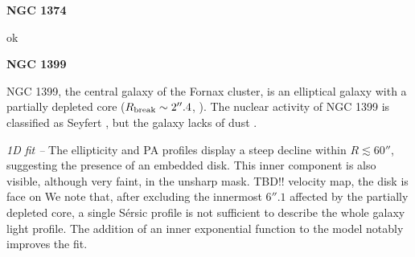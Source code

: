 \documentclass[preprint2]{emulateapj}
\begin{document}
  \clearpage\newpage\noindent
  {\bf NGC 1374 \\}

  ok

  \clearpage\newpage\noindent
  {\bf NGC 1399 \\}

  NGC 1399, the central galaxy of the Fornax cluster, is an elliptical galaxy with a partially depleted core 
  ($R_{\rm break} \sim 2''.4$, \citealt{rusli2013,dullograham2014cores}).
  The nuclear activity of NGC 1399 is classified as Seyfert \citep{veroncettyveron2006},
  but the galaxy lacks of dust \citep{tran2001}.


  \emph{1D fit -- }
  The ellipticity and PA profiles display a steep decline within $R \lesssim 60''$,
  suggesting the presence of an embedded disk.
  This inner component is also visible, although very faint, in the unsharp mask.
  TBD!! velocity map, the disk is face on
  We note that, after excluding the innermost $6''.1$ affected by the partially depleted core,
  a single S\'ersic profile is not sufficient to describe the whole galaxy light profile.
  The addition of an inner exponential function to the model 
  notably improves the fit.
\end{document}
